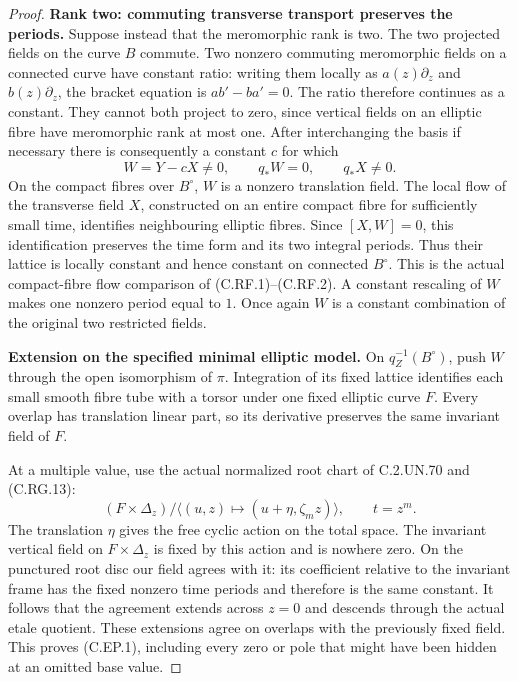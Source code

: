 \begin{proof}
\par\medskip\noindent\textbf{Rank two: commuting transverse transport preserves the periods.}
Suppose instead that the meromorphic rank is two.
The two projected fields on the curve \(B\)
commute. Two nonzero commuting meromorphic fields
on a connected curve have constant ratio:
writing them locally as \(a(z)\partial_z\) and
\(b(z)\partial_z\), the bracket equation is
\(ab'-ba'=0\). The ratio therefore continues as
a constant. They cannot both project to zero,
since vertical fields on an elliptic fibre have
meromorphic rank at most one. After interchanging
the basis if necessary there is consequently a
constant \(c\) for which
\[
             W=Y-cX\ne0,\qquad q_*W=0,\qquad
                         q_*X\ne0 .
 \tag{C.EP.7}
\]
On the compact fibres over \(B^\circ\), \(W\)
is a nonzero translation field. The local flow
of the transverse field \(X\), constructed on
an entire compact fibre for sufficiently small
time, identifies neighbouring elliptic fibres.
Since \([X,W]=0\), this identification preserves
the time form and its two integral periods.
Thus their lattice is locally constant and
hence constant on connected \(B^\circ\).
This is the actual compact-fibre flow comparison
of (C.RF.1)--(C.RF.2). A constant rescaling of
\(W\) makes one nonzero period equal to \(1\).
Once again \(W\) is a constant combination of
the original two restricted fields.

\par\medskip\noindent\textbf{Extension on the specified minimal elliptic model.}
On \(q_Z^{-1}(B^\circ)\), push \(W\) through
the open isomorphism of \(\pi\). Integration of
its fixed lattice identifies each small smooth
fibre tube with a torsor under one fixed elliptic
curve \(F\). Every overlap has translation
linear part, so its derivative preserves the
same invariant field of \(F\).

At a multiple value, use the actual normalized
root chart of C.2.UN.70 and (C.RG.13):
\[
 (F\times\Delta_z)/\langle
       (u,z)\longmapsto(u+\eta,\zeta_mz)\rangle,
       \qquad t=z^m .
 \tag{C.EP.8}
\]
The translation \(\eta\) gives the free cyclic
action on the total space. The invariant
vertical field on \(F\times\Delta_z\) is fixed
by this action and is nowhere zero. On the
punctured root disc our field agrees with it:
its coefficient relative to the invariant
frame has the fixed nonzero time periods and
therefore is the same constant. It follows
that the agreement extends across \(z=0\)
and descends through the actual etale quotient.
These extensions agree on overlaps with the
previously fixed field. This proves (C.EP.1),
including every zero or pole that might have
been hidden at an omitted base value.


\end{proof}
